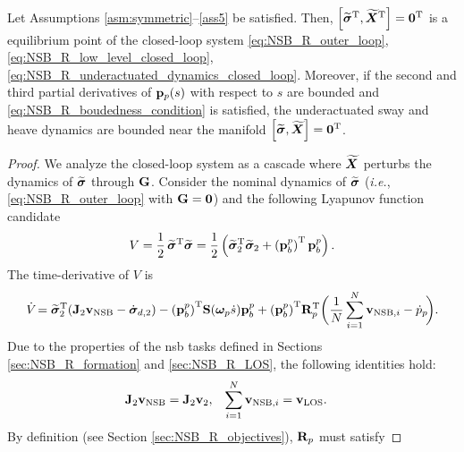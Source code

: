 \begin{theorem} \label{thm_NSB_R}
    Let Assumptions \ref{asm:symmetric}--\ref{ass5} be satisfied.
    Then, $\left[\widetilde{\bm{\sigma}}^{\mathrm{T}}, \widetilde{\bm{X}}^{\mathrm{T}}\right] = \mathbf{0}^{\mathrm{T}}$ is a  equilibrium point of the closed-loop system \eqref{eq:NSB_R_outer_loop}, \eqref{eq:NSB_R_low_level_closed_loop}, \eqref{eq:NSB_R_underactuated_dynamics_closed_loop}.
    Moreover, if the second and third partial derivatives of $\mathbf{p}_p(s)$ with respect to $s$ are bounded and \eqref{eq:NSB_R_boudedness_condition} is satisfied, the underactuated sway and heave dynamics are bounded near the manifold $\left[\widetilde{\bm{\sigma}}, \widetilde{\bm{X}}\right] = \mathbf{0}^{\mathrm{T}}$.
\end{theorem}

\begin{proof}
    We analyze the closed-loop system as a cascade where $\widetilde{\bm{X}}$ perturbs the dynamics of $\widetilde{\bm{\sigma}}$ through $\mathbf{G}$.
    Consider the nominal dynamics of $\widetilde{\bm{\sigma}}$ (\emph{i.e.}, \eqref{eq:NSB_R_outer_loop} with $\mathbf{G} = \mathbf{0}$) and the following Lyapunov function candidate 
    \begin{equation}
        V = \frac{1}{2}\,\widetilde{\bm{\sigma}}^{\mathrm{T}}\widetilde{\bm{\sigma}} = \frac{1}{2}\left(\widetilde{\bm{\sigma}}_2^{\mathrm{T}}\widetilde{\bm{\sigma}}_2 + \left(\mathbf{p}_b^p\right)^{\mathrm{T}}\mathbf{p}_b^p\right).
    \end{equation}
    The time-derivative of $V$ is 
    \begin{equation}
            \dot{V}\! = \widetilde{\bm{\sigma}}_2^{\mathrm{T}}\!\left(\mathbf{J}_2\mathbf{v}_{\rm NSB} - \dot{\bm{\sigma}}_{d, 2}\right)
            - \left(\mathbf{p}_b^p\right)^{\mathrm{T}}\!\mathbf{S}\!\left(\bm{\omega}_p\dot{s}\right)\!\mathbf{p}_b^p 
            + \left(\mathbf{p}_b^p\right)^{\mathrm{T}}\!\mathbf{R}_p^{\mathrm{T}}\bigg(\frac{1}{N}\sum_{i=1}^N\mathbf{v}_{{\rm NSB}, i} - \dot{p}_p\!\bigg) .
        \label{eq:NSB_R_Lyapunov_analysis_step1}
    \end{equation}
    Due to the properties of the \gls{nsb} tasks defined in Sections \ref{sec:NSB_R_formation} and \ref{sec:NSB_R_LOS}, the following identities hold: 
    \begin{align}
        \mathbf{J}_2\mathbf{v}_{\rm NSB} &= \mathbf{J}_2\mathbf{v}_2, &
        \sum_{i=1}^N \mathbf{v}_{{\rm NSB}, i} &= \mathbf{v}_{\rm LOS}.
    \end{align}
    By definition (see Section \ref{sec:NSB_R_objectives}), $\mathbf{R}_p$ must satisfy 

\end{proof}
